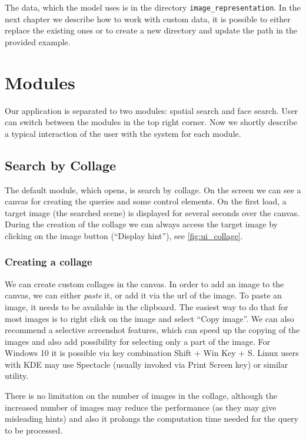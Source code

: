 The data, which the model uses is in the directory \verb+image_representation+. In the next chapter we describe how to work with custom data, it is possible to either replace the existing ones or to create a new directory and update the path in the provided example.

\section{Modules}

Our application is separated to two modules: spatial search and face search. User can switch between the modules in the top right corner. Now we shortly describe a typical interaction of the user with the system for each module.

\subsection{Search by Collage}

The default module, which opens, is search by collage. On the screen we can see a canvas for creating the queries and some control elements. On the first load, a target image (the searched scene) is displayed for several seconds over the canvas. During the creation of the collage we can always access the target image by clicking on the image button (``Display hint''), see \autoref{fig:ui_collage}.

\subsubsection*{Creating a collage}

We can create custom collages in the canvas. In order to add an image to the canvas, we can either \emph{paste} it, or add it via the url of the image. To paste an image, it needs to be available in the clipboard. The easiest way to do that for most images is to right click on the image and select ``Copy image''. We can also recommend a selective screenshot features, which can speed up the copying of the images and also add possibility for selecting only a part of the image. For Windows 10 it is possible via key combination Shift + Win Key + S. Linux users with KDE may use Spectacle (usually invoked via Print Screen key) or similar utility.

There is no limitation on the number of images in the collage, although the increased number of images may reduce the performance (as they may give misleading hints) and also it prolongs the computation time needed for the query to be processed.

